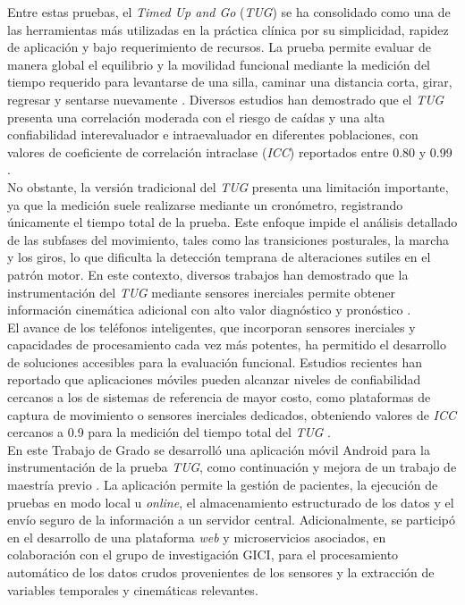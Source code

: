 \documentclass[12pt]{report}
\begin{document}
\begin{justify}
    Entre estas pruebas, el \textit{Timed Up and Go} (\textit{TUG}) se ha consolidado como una de las herramientas más utilizadas en la práctica clínica por su simplicidad, rapidez de aplicación y bajo requerimiento de recursos. La prueba permite evaluar de manera global el equilibrio y la movilidad funcional mediante la medición del tiempo requerido para levantarse de una silla, caminar una distancia corta, girar, regresar y sentarse nuevamente \cite{TimedUpAndGoTUG}. Diversos estudios han demostrado que el \textit{TUG} presenta una correlación moderada con el riesgo de caídas y una alta confiabilidad interevaluador e intraevaluador en diferentes poblaciones, con valores de coeficiente de correlación intraclase (\textit{ICC}) reportados entre 0.80 y 0.99 \cite{Sensibilidad_TUG}.\\

    No obstante, la versión tradicional del \textit{TUG} presenta una limitación importante, ya que la medición suele realizarse mediante un cronómetro, registrando únicamente el tiempo total de la prueba. Este enfoque impide el análisis detallado de las subfases del movimiento, tales como las transiciones posturales, la marcha y los giros, lo que dificulta la detección temprana de alteraciones sutiles en el patrón motor. En este contexto, diversos trabajos han demostrado que la instrumentación del \textit{TUG} mediante sensores inerciales permite obtener información cinemática adicional con alto valor diagnóstico y pronóstico \cite{Convergent-Validity-wearable-sensors}.\\

    El avance de los teléfonos inteligentes, que incorporan sensores inerciales y capacidades de procesamiento cada vez más potentes, ha permitido el desarrollo de soluciones accesibles para la evaluación funcional. Estudios recientes han reportado que aplicaciones móviles pueden alcanzar niveles de confiabilidad cercanos a los de sistemas de referencia de mayor costo, como plataformas de captura de movimiento o sensores inerciales dedicados, obteniendo valores de \textit{ICC} cercanos a 0.9 para la medición del tiempo total del \textit{TUG} \cite{Reliability_Accuracy_Falls_Risk}.\\

    En este Trabajo de Grado se desarrolló una aplicación móvil Android para la instrumentación de la prueba \textit{TUG}, como continuación y mejora de un trabajo de maestría previo \cite{Sistema-portable-TUG-AKuleshov}. La aplicación permite la gestión de pacientes, la ejecución de pruebas en modo local u \textit{online}, el almacenamiento estructurado de los datos y el envío seguro de la información a un servidor central. Adicionalmente, se participó en el desarrollo de una plataforma \textit{web} y microservicios asociados, en colaboración con el grupo de investigación GICI, para el procesamiento automático de los datos crudos provenientes de los sensores y la extracción de variables temporales y cinemáticas relevantes.\\


\end{justify}
\end{document}
